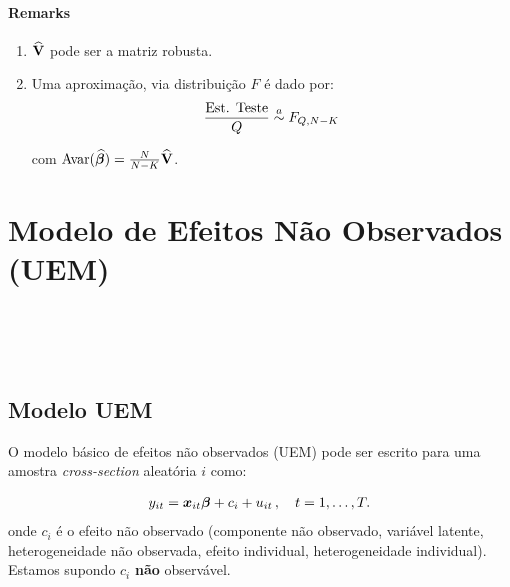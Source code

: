\documentclass[11pt, oneside, a4paper, article]{article}
\numberwithin{equation}{section}
\begin{document}
\paragraph{Remarks}
\begin{enumerate}
	\item $\widehat{\mathbf{V}}$ pode ser a matriz robusta.

	\item Uma aproximação, via distribuição $F$ é dado por:
\begin{align*}
	\frac{\text{Est. Teste}}{Q} \overset{a}{\sim} F_{Q, N-K}
\end{align*}

\noindent
com $\text{Avar}(\widehat{\boldsymbol{\beta}}) = \frac{N}{N-K} \widehat{\mathbf{V}}$.
\end{enumerate}


\clearpage
\section{Modelo de Efeitos Não Observados (UEM)}
\noindent
\citet[C.10 -- Basic Linear Unobserved Effects Panel Data Models, p.247--291]{wool-2010} \\
\citet[Sec.10.1 -- Motivation: The Omitted Variables Problem, p.247]{wool-2010}\\
\citet[Sec.10.2 -- Assumptions about the Unobserved Effects and Explanatory Variables, p.251]{wool-2010}\\
\citet[Sec.10.3 -- Estimating UEM by POLS, p.256]{wool-2010}

\subsection{Modelo UEM}

O modelo básico de efeitos não observados (UEM) pode ser escrito para uma amostra \textit{cross-section} aleatória $i$ como:

\vspace{-1 em}
\begin{align}\label{uem:mod:1}
	y_{it} = \boldsymbol{x}_{it} \boldsymbol{\beta} + c_{i} + u_{it} \, , \quad t=1,\dots, T.
\end{align}
onde $c_{i}$ é o efeito não observado (componente não observado, variável latente, heterogeneidade não observada, efeito individual, heterogeneidade individual).
Estamos supondo $c_{i}$ \textbf{não} observável.
\end{document}
